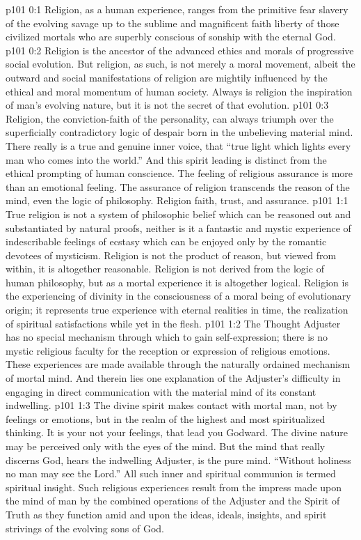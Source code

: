 \author{Melchizedek}
\vs p101 0:1 Religion, as a human experience, ranges from the primitive fear slavery of the evolving savage up to the sublime and magnificent faith liberty of those civilized mortals who are superbly conscious of sonship with the eternal God.
\vs p101 0:2 Religion is the ancestor of the advanced ethics and morals of progressive social evolution. But religion, as such, is not merely a moral movement, albeit the outward and social manifestations of religion are mightily influenced by the ethical and moral momentum of human society. Always is religion the inspiration of man’s evolving nature, but it is not the secret of that evolution.
\vs p101 0:3 Religion, the conviction\hyp{}faith of the personality, can always triumph over the superficially contradictory logic of despair born in the unbelieving material mind. There really is a true and genuine inner voice, that “true light which lights every man who comes into the world.” And this spirit leading is distinct from the ethical prompting of human conscience. The feeling of religious assurance is more than an emotional feeling. The assurance of religion transcends the reason of the mind, even the logic of philosophy. Religion  faith, trust, and assurance.
\vs p101 1:1 True religion is not a system of philosophic belief which can be reasoned out and substantiated by natural proofs, neither is it a fantastic and mystic experience of indescribable feelings of ecstasy which can be enjoyed only by the romantic devotees of mysticism. Religion is not the product of reason, but viewed from within, it is altogether reasonable. Religion is not derived from the logic of human philosophy, but as a mortal experience it is altogether logical. Religion is the experiencing of divinity in the consciousness of a moral being of evolutionary origin; it represents true experience with eternal realities in time, the realization of spiritual satisfactions while yet in the flesh.
\vs p101 1:2 \pc The Thought Adjuster has no special mechanism through which to gain self\hyp{}expression; there is no mystic religious faculty for the reception or expression of religious emotions. These experiences are made available through the naturally ordained mechanism of mortal mind. And therein lies one explanation of the Adjuster’s difficulty in engaging in direct communication with the material mind of its constant indwelling.
\vs p101 1:3 The divine spirit makes contact with mortal man, not by feelings or emotions, but in the realm of the highest and most spiritualized thinking. It is your  not your feelings, that lead you Godward. The divine nature may be perceived only with the eyes of the mind. But the mind that really discerns God, hears the indwelling Adjuster, is the pure mind. “Without holiness no man may see the Lord.” All such inner and spiritual communion is termed spiritual insight. Such religious experiences result from the impress made upon the mind of man by the combined operations of the Adjuster and the Spirit of Truth as they function amid and upon the ideas, ideals, insights, and spirit strivings of the evolving sons of God.
